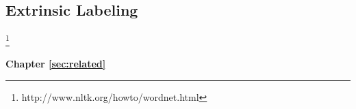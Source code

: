  





	
	
\subsection{Extrinsic Labeling}
\label{sec:extrinsic}

\footnote{http://www.nltk.org/howto/wordnet.html}
%

\textbf{Chapter \ref{sec:related}} \\[0.2em]
\blindtext
